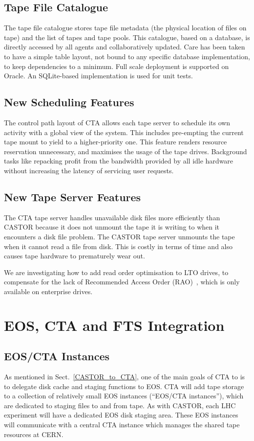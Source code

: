 \documentclass{webofc}
\begin{document}
\subsection{Tape File Catalogue}
The tape file catalogue stores tape file metadata (the physical location of files on tape) and the list of tapes and tape pools.
This catalogue, based on a database, is directly accessed by all agents and collaboratively updated. Care has been taken to
have a simple table layout, not bound to any specific database implementation, to keep dependencies to
a minimum. Full scale deployment is supported on Oracle. An SQLite-based implementation
is used for unit tests.

\subsection{New Scheduling Features}
The control path layout of CTA allows each tape server to schedule its own activity with a global view of the system.
This includes pre-empting the current tape mount to yield to a higher-priority one. This feature renders resource reservation
unnecessary, and maximises the usage of the tape drives. Background tasks like repacking profit from 
the bandwidth provided by all idle hardware without increasing the latency of servicing user requests.

\subsection{New Tape Server Features}
The CTA tape server handles unavailable disk files more efficiently than CASTOR because it does not unmount
the tape it is writing to when it encounters a disk file problem. The CASTOR tape server unmounts the tape
when it cannot read a file from disk. This is costly in terms of time and also causes tape hardware to prematurely wear out.

We are investigating how to add read order optimisation to LTO drives, to compensate for the lack of Recommended
Access Order (RAO)~\cite{cristina_msc_thesis}, which is only available on enterprise drives.

\section{EOS, CTA and FTS Integration}
\label{EOS_CTA_and_FTS_Integration}

\subsection{EOS/CTA Instances}
As mentioned in Sect.~\ref{CASTOR_to_CTA}, one of the main goals of CTA to is to delegate disk cache
and staging functions to EOS. CTA will add tape storage to a collection of relatively small EOS instances
(``EOS/CTA instances''), which are dedicated to staging files to and from tape. As with CASTOR, each LHC
experiment will have a dedicated EOS disk staging area. These EOS instances will communicate with a central
CTA instance which manages the shared tape resources at CERN.
\end{document}
